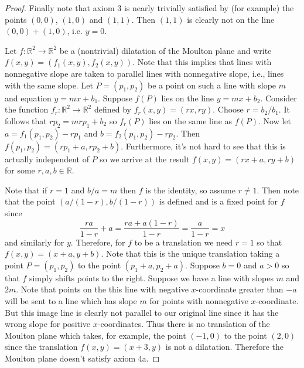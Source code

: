 \documentclass{article}
\begin{document}
\begin{proof}
Finally note that axiom 3 is nearly trivially satisfied by (for example) the points $(0,0)$, $(1,0)$ and $(1,1)$. Then $(1,1)$ is clearly not on the line $(0,0) + (1,0)$, i.e. $y = 0$.

Let $f : \mathbb{R}^2 \to \mathbb{R}^2$ be a (nontrivial) dilatation of the Moulton plane and write $f(x,y) = (f_1(x,y),f_2(x,y))$. Note that this implies that lines with nonnegative slope are taken to parallel lines with nonnegative slope, i.e., lines with the same slope. Let $P = (p_1,p_2)$ be a point on such a line with slope $m$ and equation $y = mx + b_1$. Suppose $f(P)$ lies on the line $y = mx + b_2$. Consider the function $f_r : \mathbb{R}^2 \to \mathbb{R}^2$ defined by $f_r(x,y) = (rx,ry)$. Choose $r = b_2/b_1$. It follows that $rp_2 = mrp_1 + b_2$ so $f_r(P)$ lies on the same line as $f(P)$. Now let $a = f_1(p_1,p_2) - rp_1$ and $b = f_2(p_1,p_2) - rp_2$. Then $f(p_1,p_2) = (rp_1 + a, rp_2 + b)$. Furthermore, it's not hard to see that this is actually independent of $P$ so we arrive at the result $f(x,y) = (rx + a, ry + b)$ for some $r,a,b \in \mathbb{R}$.

Note that if $r = 1$ and $b/a = m$ then $f$ is the identity, so assume $r \neq 1$. Then note that the point $(a/(1-r), b/(1-r))$ is defined and is a fixed point for $f$ since
\[
\frac{ra}{1-r} + a = \frac{ra + a(1-r)}{1-r} = \frac{a}{1-r} = x
\]
and similarly for $y$. Therefore, for $f$ to be a translation we need $r = 1$ so that $f(x,y) = (x+a,y+b)$. Note that this is the unique translation taking a point $P = (p_1,p_2)$ to the point $(p_1+a,p_2+a)$. Suppose $b = 0$ and $a > 0$ so that $f$ simply shifts points to the right. Suppose we have a line with slopes $m$ and $2m$. Note that points on the this line with negative $x$-coordinate greater than $-a$ will be sent to a line which has slope $m$ for points with nonnegative $x$-coordinate. But this image line is clearly not parallel to our original line since it has the wrong slope for positive $x$-coordinates. Thus there is no translation of the Moulton plane which takes, for example, the point $(-1,0)$ to the point $(2,0)$ since the translation $f(x,y) = (x+3,y)$ is not a dilatation. Therefore the Moulton plane doesn't satisfy axiom 4a.
\end{proof}
\end{document}
